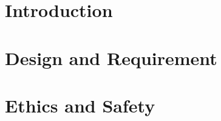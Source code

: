 \documentclass[12pt]{article}
\begin{document}

\clearpage
\section{Introduction}

\clearpage

\clearpage
\section{Design and Requirement}

\clearpage

\clearpage
\section{Ethics and Safety}

\clearpage


%     


\end{document}

